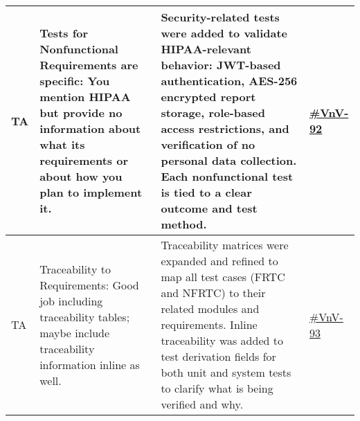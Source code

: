 \documentclass{article}
\begin{document}
\begin{longtable}{|p{1.48cm}|p{5cm}|p{4.7cm}|p{1cm}|}
TA & Tests for Nonfunctional Requirements are specific: You mention HIPAA but provide no information about what its requirements or about how you plan to implement it. & Security-related tests were added to validate HIPAA-relevant behavior: JWT-based authentication, AES-256 encrypted report storage, role-based access restrictions, and verification of no personal data collection. Each nonfunctional test is tied to a clear outcome and test method.&\href{https://github.com/harrisonchiu/xray/issues/92}{\#VnV-92}\\
\hline

TA & Traceability to Requirements: Good job including traceability tables; maybe include traceability information inline as well. & Traceability matrices were expanded and refined to map all test cases (FRTC and NFRTC) to their related modules and requirements. Inline traceability was added to test derivation fields for both unit and system tests to clarify what is being verified and why. &\href{https://github.com/harrisonchiu/xray/issues/93}{\#VnV-93}\\
\hline

\end{longtable}
\end{document}
